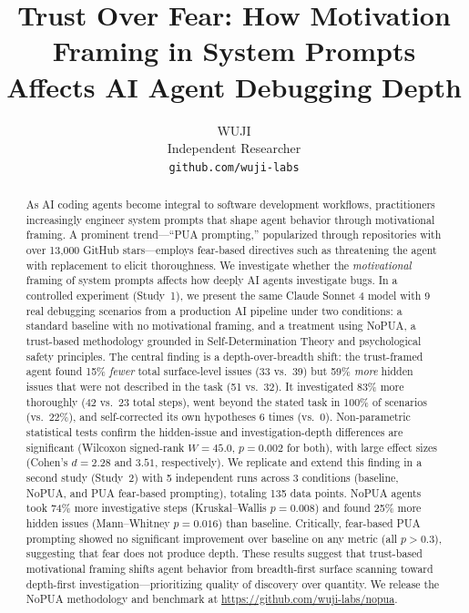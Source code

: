 \documentclass[11pt]{article}
\title{Trust Over Fear: How Motivation Framing in System Prompts\\Affects AI Agent Debugging Depth}
\author{
  WUJI\\
  Independent Researcher\\
  \texttt{github.com/wuji-labs}
}
\date{}
\begin{document}
\maketitle

\begin{abstract}
As AI coding agents become integral to software development workflows, practitioners increasingly engineer system prompts that shape agent behavior through motivational framing. A prominent trend---``PUA prompting,'' popularized through repositories with over 13{,}000 GitHub stars---employs fear-based directives such as threatening the agent with replacement to elicit thoroughness. We investigate whether the \emph{motivational} framing of system prompts affects how deeply AI agents investigate bugs. In a controlled experiment (Study~1), we present the same Claude Sonnet 4 model with 9 real debugging scenarios from a production AI pipeline under two conditions: a standard baseline with no motivational framing, and a treatment using NoPUA, a trust-based methodology grounded in Self-Determination Theory and psychological safety principles. The central finding is a depth-over-breadth shift: the trust-framed agent found 15\% \emph{fewer} total surface-level issues (33 vs.\ 39) but 59\% \emph{more} hidden issues that were not described in the task (51 vs.\ 32). It investigated 83\% more thoroughly (42 vs.\ 23 total steps), went beyond the stated task in 100\% of scenarios (vs.\ 22\%), and self-corrected its own hypotheses 6 times (vs.\ 0). Non-parametric statistical tests confirm the hidden-issue and investigation-depth differences are significant (Wilcoxon signed-rank $W = 45.0$, $p = 0.002$ for both), with large effect sizes (Cohen's $d = 2.28$ and $3.51$, respectively). We replicate and extend this finding in a second study (Study~2) with 5 independent runs across 3 conditions (baseline, NoPUA, and PUA fear-based prompting), totaling 135 data points. NoPUA agents took 74\% more investigative steps (Kruskal--Wallis $p = 0.008$) and found 25\% more hidden issues (Mann--Whitney $p = 0.016$) than baseline. Critically, fear-based PUA prompting showed no significant improvement over baseline on any metric (all $p > 0.3$), suggesting that fear does not produce depth. These results suggest that trust-based motivational framing shifts agent behavior from breadth-first surface scanning toward depth-first investigation---prioritizing quality of discovery over quantity. We release the NoPUA methodology and benchmark at \url{https://github.com/wuji-labs/nopua}.
\end{abstract}
\end{document}

